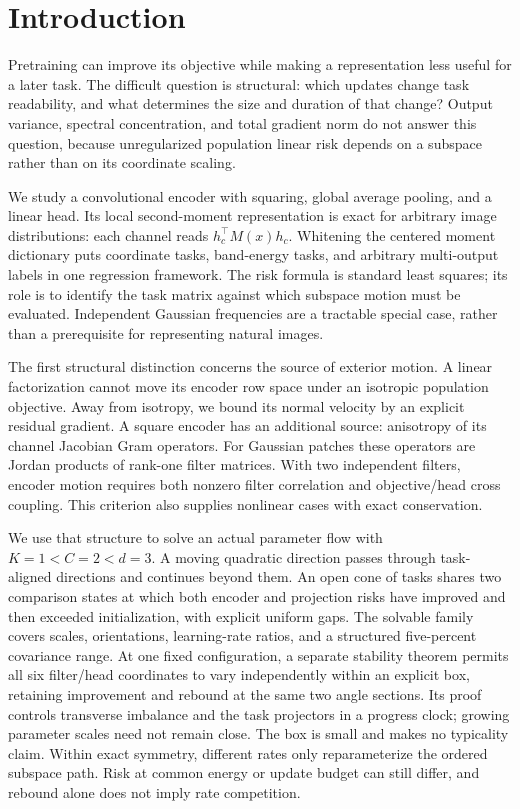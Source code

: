 \section{Introduction}
Pretraining can improve its objective while making a representation less useful for a later task. The difficult question is structural: which updates change task readability, and what determines the size and duration of that change? Output variance, spectral concentration, and total gradient norm do not answer this question, because unregularized population linear risk depends on a subspace rather than on its coordinate scaling.

We study a convolutional encoder with squaring, global average pooling, and a linear head. Its local second-moment representation is exact for arbitrary image distributions: each channel reads $h_c^\top M(x)h_c$. Whitening the centered moment dictionary puts coordinate tasks, band-energy tasks, and arbitrary multi-output labels in one regression framework. The risk formula is standard least squares; its role is to identify the task matrix against which subspace motion must be evaluated. Independent Gaussian frequencies are a tractable special case, rather than a prerequisite for representing natural images.

The first structural distinction concerns the source of exterior motion. A linear factorization cannot move its encoder row space under an isotropic population objective. Away from isotropy, we bound its normal velocity by an explicit residual gradient. A square encoder has an additional source: anisotropy of its channel Jacobian Gram operators. For Gaussian patches these operators are Jordan products of rank-one filter matrices. With two independent filters, encoder motion requires both nonzero filter correlation and objective/head cross coupling. This criterion also supplies nonlinear cases with exact conservation.

We use that structure to solve an actual parameter flow with $K=1<C=2<d=3$. A moving quadratic direction passes through task-aligned directions and continues beyond them. An open cone of tasks shares two comparison states at which both encoder and projection risks have improved and then exceeded initialization, with explicit uniform gaps. The solvable family covers scales, orientations, learning-rate ratios, and a structured five-percent covariance range. At one fixed configuration, a separate stability theorem permits all six filter/head coordinates to vary independently within an explicit box, retaining improvement and rebound at the same two angle sections. Its proof controls transverse imbalance and the task projectors in a progress clock; growing parameter scales need not remain close. The box is small and makes no typicality claim. Within exact symmetry, different rates only reparameterize the ordered subspace path. Risk at common energy or update budget can still differ, and rebound alone does not imply rate competition.

